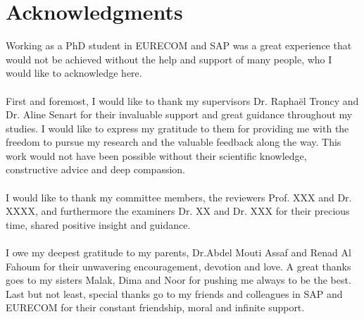 \chapter*{Acknowledgments}

Working as a PhD student in EURECOM and SAP was a great experience that would not be achieved without the help and support of many people, who I would like to acknowledge here.
\\
\\
First and foremost, I would like to thank my supervisors Dr. Rapha\"el Troncy and Dr. Aline Senart for their invaluable support and great guidance throughout my studies. I would like to express my gratitude to them for providing me with the freedom to pursue my research and the valuable feedback along the way. This work would not have been possible without their scientific knowledge, constructive advice and deep compassion.
\\
\\
I would like to thank my committee members, the reviewers Prof. XXX  and Dr. XXXX, and furthermore the examiners Dr. XX and Dr. XXX for their precious time, shared positive insight and guidance.
\\
\\
I owe my deepest gratitude to my parents, Dr.Abdel Mouti Assaf and Renad Al Fahoum for their unwavering encouragement, devotion and love. A great thanks goes to my sisters Malak, Dima and Noor for pushing me always to be the best.  Last but not least, special thanks go to my friends and colleagues in SAP and EURECOM for their constant friendship, moral and infinite support.
